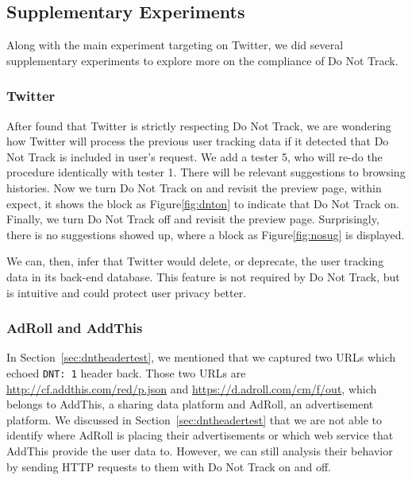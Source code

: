 \documentclass{sig-alternate}
\begin{document}
\subsection{Supplementary Experiments} \label{sec:supplement}
Along with the main experiment targeting on Twitter, we did several supplementary experiments to explore more on the compliance of Do Not Track.

\subsubsection{Twitter}
After found that Twitter is strictly respecting Do Not Track, we are wondering how Twitter will process the previous user tracking data if it detected that Do Not Track is included in user's request. We add a tester 5, who will re-do the procedure identically with tester 1. There will be relevant suggestions to browsing histories. Now we turn Do Not Track on and revisit the preview page, within expect, it shows the block as Figure\ref{fig:dnton} to indicate that Do Not Track on. Finally, we turn Do Not Track off and revisit the preview page. Surprisingly, there is no suggestions showed up, where a block as Figure\ref{fig:nosug} is displayed. 

We can, then, infer that Twitter would delete, or deprecate, the user tracking data in its back-end database. This feature is not required by Do Not Track, but is intuitive and could protect user privacy better.

\subsubsection{AdRoll and AddThis}

In Section~\ref{sec:dntheadertest}, we mentioned that we captured two URLs which echoed \verb|DNT: 1| header back. Those two URLs are \url{http://cf.addthis.com/red/p.json} and \url{https://d.adroll.com/cm/f/out}, which belongs to AddThis, a sharing data platform and AdRoll, an advertisement platform. We discussed in Section~\ref{sec:dntheadertest} that we are not able to identify where AdRoll is placing their advertisements or which web service that AddThis provide the user data to. However, we can still analysis their behavior by sending HTTP requests to them with Do Not Track on and off.
\end{document}
